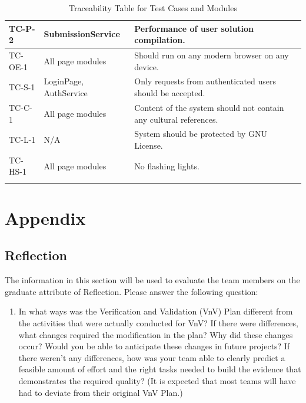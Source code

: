 \documentclass[12pt, titlepage]{article}
\begin{document}
\begin{longtable}{| p{2.5cm} | p{5cm} | p{6cm}| }
    \hline
    TC-P-2 & SubmissionService & Performance of user solution compilation.\\
     \hline
    TC-OE-1 & All page modules & Should run on any modern browser on any device. \\
     \hline
    TC-S-1 & LoginPage, AuthService & Only requests from authenticated users should be accepted. \\
     \hline
    TC-C-1 &  All page modules & Content of the system should not contain any cultural references.\\
     \hline
    TC-L-1 & N/A & System should be protected by GNU License.\\
     \hline
     TC-HS-1 & All page modules & No flashing lights.\\
     \hline
    \caption{Traceability Table for Test Cases and Modules}
    \label{tab:trace}
\end{longtable}





\newpage{}
\section*{Appendix}

\subsection{Reflection}
The information in this section will be used to evaluate the team members on the
graduate attribute of Reflection.  Please answer the following question:

\begin{enumerate}
  \item In what ways was the Verification and Validation (VnV) Plan different
  from the activities that were actually conducted for VnV?  If there were
  differences, what changes required the modification in the plan?  Why did
  these changes occur?  Would you be able to anticipate these changes in future
  projects?  If there weren't any differences, how was your team able to clearly
  predict a feasible amount of effort and the right tasks needed to build the
  evidence that demonstrates the required quality?  (It is expected that most
  teams will have had to deviate from their original VnV Plan.)
  
   
\end{enumerate}
\end{document}
